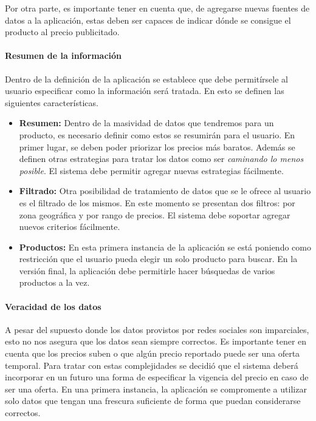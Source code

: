 \documentclass[10pt, a4paper]{article}
\begin{document}
Por otra parte, es importante tener en cuenta que, de agregarse nuevas fuentes de datos a la aplicación, estas deben ser capaces de indicar dónde se consigue el producto al precio publicitado.

\paragraph{Resumen de la información}
Dentro de la definición de la aplicación se establece que debe permitírsele al usuario especificar como la información será tratada. En esto se definen las siguientes características.

\begin{itemize}
  \item \textbf{Resumen:} Dentro de la masividad de datos que tendremos para un producto, es necesario definir como estos se resumirán para el usuario. En primer lugar, se deben poder priorizar los precios más baratos. Además se definen otras estrategias para tratar los datos como ser \emph{caminando lo menos posible}. El sistema debe permitir agregar nuevas estrategias fácilmente.
  \item \textbf{Filtrado:} Otra posibilidad de tratamiento de datos que se le ofrece al usuario es el filtrado de los mismos. En este momento se presentan dos filtros: por zona geográfica y por rango de precios. El sistema debe soportar agregar nuevos criterios fácilmente.
  \item \textbf{Productos:} En esta primera instancia de la aplicación se está poniendo como restricción que el usuario pueda elegir un solo producto para buscar. En la versión final, la aplicación debe permitirle hacer búsquedas de varios productos a la vez.
\end{itemize}

\paragraph{Veracidad de los datos} A pesar del supuesto donde los datos provistos por redes sociales son imparciales, esto no nos asegura que los datos sean siempre correctos. Es importante tener en cuenta que los precios suben o que algún precio reportado puede ser una oferta temporal. Para tratar con estas complejidades se decidió que el sistema deberá incorporar en un futuro una forma de especificar la vigencia del precio en caso de ser una oferta. En una primera instancia, la aplicación se compromente a utilizar solo datos que tengan una frescura suficiente de forma que puedan considerarse correctos.
\end{document}
